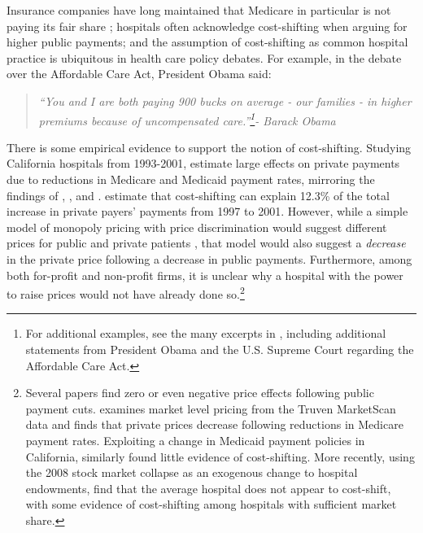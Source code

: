 \documentclass[12pt]{article}
\begin{document}
Insurance companies have long maintained that Medicare in particular is not paying its fair share \citep{frakt2011}; hospitals often acknowledge cost-shifting when arguing for higher public payments; and the assumption of cost-shifting as common hospital practice is ubiquitous in health care policy debates. For example, in the debate over the Affordable Care Act, President Obama said:
\begin{quote}
\textit{``You and I are both paying 900 bucks on average - our families - in higher premiums because of uncompensated care.''\footnote{For additional examples, see the many excerpts in \cite{dranove2017}, including additional statements from President Obama and the U.S. Supreme Court regarding the Affordable Care Act.}- Barack Obama}
\end{quote}
There is some empirical evidence to support the notion of cost-shifting. Studying California hospitals from 1993-2001, \cite{zwanziger2006} estimate large effects on private payments due to reductions in Medicare and Medicaid payment rates, mirroring the findings of \cite{lee2003}, \cite{zwanziger2000}, and \cite{cutler1998costshift}. \cite{zwanziger2006} estimate that cost-shifting can explain 12.3\% of the total increase in private payers' payments from 1997 to 2001.  However, while a simple model of monopoly pricing with price discrimination would suggest different prices for public and private patients \citep{hay1983}, that model would also suggest a \textit{decrease} in the private price following a decrease in public payments.  Furthermore, among both for-profit and non-profit firms, it is unclear why a hospital with the power to raise prices would not have already done so.\footnote{Several papers find zero or even negative price effects following public payment cuts. \cite{white2013} examines market level pricing from the Truven MarketScan data and finds that private prices decrease following reductions in Medicare payment rates. Exploiting a change in Medicaid payment policies in California, \citet{dranove1998} similarly found little evidence of cost-shifting. More recently, using the 2008 stock market collapse as an exogenous change to hospital endowments, \cite{dranove2017} find that the average hospital does not appear to cost-shift, with some evidence of cost-shifting among hospitals with sufficient market share. }
\end{document}
